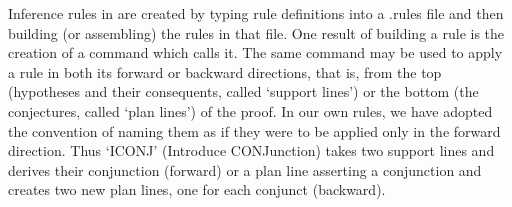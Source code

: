 % 
% 
% 
% 
Inference rules in {\TPS} are created by typing rule definitions into a .rules
file and then building (or assembling) the rules in that file.
One result of building a rule is the creation of a command which
calls it. The same command may be
used to apply a rule in both its forward or backward directions, that is,
from the top (hypotheses and their consequents, called `support lines') or
the bottom (the conjectures, called `plan lines') of the proof. In our own
rules, we have adopted the convention of naming them as if they were to be
applied only in the forward direction. Thus `ICONJ' (Introduce CONJunction)
takes two
support lines and derives their conjunction (forward) or a plan line asserting
a conjunction and creates two new plan lines, one for each conjunct (backward).

